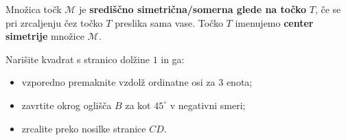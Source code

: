                  Množica točk $\mathcal{M}$ je \textbf{središčno simetrična/somerna glede na točko} $T$, 
                če se pri zrcaljenju čez točko $T$ preslika sama vase. 
                Točko $T$ imenujemo \textbf{center simetrije} množice $\mathcal{M}$. 





        


        
            \begin{naloga}
                Narišite kvadrat s stranico dolžine $1$ in ga:
                \begin{itemize}
                    \item vzporedno premaknite vzdolž ordinatne osi za $3$ enota;
                    \item zavrtite okrog oglišča $B$ za kot $45^\circ$ v negativni smeri;
                    \item zrcalite preko nosilke stranice $CD$.
                \end{itemize}
            \end{naloga}

